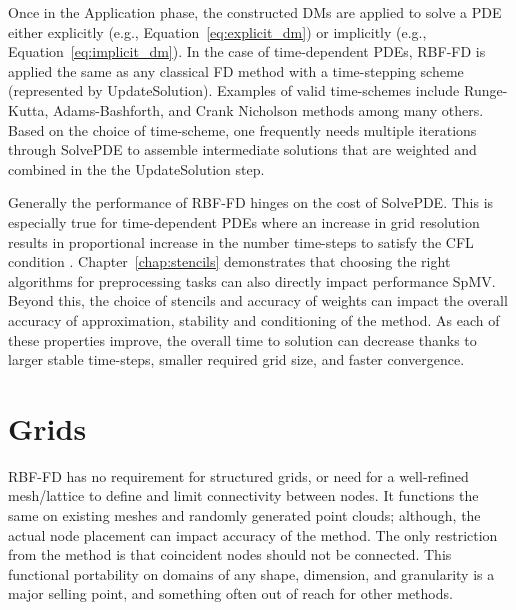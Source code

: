 \documentclass[11pt]{report}
\begin{document}
{Once in the Application phase, the constructed DMs are applied to solve a PDE either explicitly (e.g., Equation~\ref{eq:explicit_dm}) or implicitly (e.g., Equation~\ref{eq:implicit_dm}). In the case of time-dependent PDEs, RBF-FD is applied the same as any classical FD method with a time-stepping scheme (represented by UpdateSolution). Examples of valid time-schemes include Runge-Kutta, Adams-Bashforth, and Crank Nicholson methods among many others. Based on the choice of time-scheme, one frequently needs multiple iterations through SolvePDE to assemble intermediate solutions that are weighted and combined in the the UpdateSolution step.


Generally the performance of RBF-FD hinges on the cost of SolvePDE. This is especially true for time-dependent PDEs where an increase in grid resolution results in proportional increase in the number time-steps to satisfy the CFL condition \cite{CFL}. Chapter~\ref{chap:stencils} demonstrates that choosing the right algorithms for preprocessing tasks can also directly impact performance SpMV. Beyond this, the choice of stencils and accuracy of weights can impact the overall accuracy of approximation, stability and conditioning of the method. As each of these properties improve, the overall time to solution can decrease thanks to larger stable time-steps, smaller required grid size, and faster convergence.

\section{Grids} 


RBF-FD has no requirement for structured grids, or need for a well-refined mesh/lattice to define and limit connectivity between nodes. It functions the same on existing meshes and randomly generated point clouds; although, the actual node placement can impact accuracy of the method. The only restriction from the method is that coincident nodes should not be connected. This functional portability on domains of any shape, dimension, and granularity is a major selling point, and something often out of reach for other methods. 
%
%

}
\end{document}
